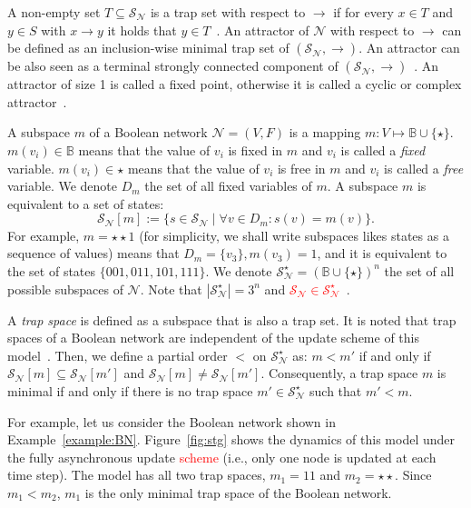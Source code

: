\documentclass[preprint,12pt]{elsarticle}
\newcommand{\change}[1]{\textcolor{red}{#1}}
\begin{document}
A non-empty set \(T \subseteq \mathcal{S}_{\mathcal{N}}\) is a trap set with respect to \(\rightarrow\) if for every \(x \in T\) and \(y \in S\) with \(x \rightarrow y\) it holds that \(y \in T\)~\cite{klarner2015computing}.
An attractor of \(\mathcal{N}\) with respect to \(\rightarrow\) can be defined as an inclusion-wise minimal trap set of \((\mathcal{S}_{\mathcal{N}}, \rightarrow)\).
An attractor can be also seen as a terminal strongly connected component of \((\mathcal{S}_{\mathcal{N}}, \rightarrow)\)~\cite{chatain2014characterization}.
An attractor of size 1 is called a fixed point, otherwise it is called a cyclic or complex attractor~\cite{klarner2015computing}.

A subspace \(m\) of a Boolean network \(\mathcal{N} = (V, F)\) is a mapping \(m \colon V \mapsto \mathbb{B} \cup \{\star\}\).
\(m(v_i) \in \mathbb{B}\) means that the value of \(v_i\) is fixed in \(m\) and \(v_i\) is called a \emph{fixed} variable.
\(m(v_i) \in \star\) means that the value of \(v_i\) is free in \(m\) and \(v_i\) is called a \emph{free} variable.
We denote \(D_m\) the set of all fixed variables of \(m\).
A subspace \(m\) is equivalent to a set of states:
\[
\mathcal{S}_{\mathcal{N}}[m] := \{s \in \mathcal{S}_{\mathcal{N}} \mid \forall v \in D_m \colon s(v) = m(v)\}.
\] For example, \(m = \star\star1\) (for simplicity, we shall write subspaces likes states as a sequence of values) means that \(D_m = \{v_3\}, m(v_3) = 1\), and it is equivalent to the set of states \(\{001, 011, 101, 111\}\).
We denote \(\mathcal{S}_{\mathcal{N}}^{\star} = (\mathbb{B} \cup \{\star\})^n\) the set of all possible subspaces of \(\mathcal{N}\).
Note that \(\left\vert\mathcal{S}_{\mathcal{N}}^{\star}\right\vert = 3^n\) and \change{\(\mathcal{S}_{\mathcal{N}} \in \mathcal{S}_{\mathcal{N}}^{\star}\)}~\cite{klarner2015computing}.

A \emph{trap space} is defined as a subspace that is also a trap set.
It is noted that trap spaces of a Boolean network are independent of the update scheme of this model~\cite{klarner2015computing}.
Then, we define a partial order \(<\) on \(\mathcal{S}_{\mathcal{N}}^{\star}\) as: \(m < m'\) if and only if \(\mathcal{S}_{\mathcal{N}}[m] \subseteq \mathcal{S}_{\mathcal{N}}[m']\) and \(\mathcal{S}_{\mathcal{N}}[m] \neq \mathcal{S}_{\mathcal{N}}[m']\).
Consequently, a trap space \(m\) is minimal if and only if there is no trap space \(m' \in \mathcal{S}_{\mathcal{N}}^{\star}\) such that \(m' < m\).

For example, let us consider the Boolean network shown in Example~\ref{example:BN}.
Figure~\ref{fig:stg} shows the dynamics of this model under the fully asynchronous update \change{scheme} (i.e., only one node is updated at each time step).
The model has all two trap spaces, \(m_1 = 11\) and \(m_2 = \star\star\).
Since \(m_1 < m_2\), \(m_1\) is the only minimal trap space of the Boolean network.
\end{document}
